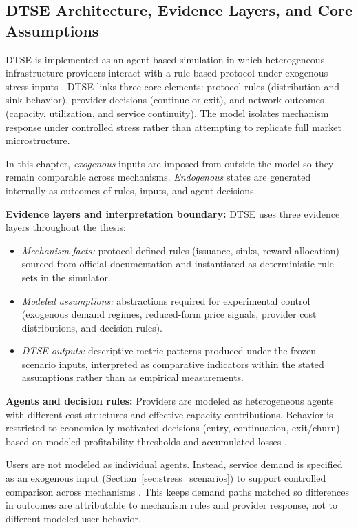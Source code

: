 \subsection{DTSE Architecture, Evidence Layers, and Core Assumptions}
\label{subsec:dtse_model_overview_assumptions}
DTSE is implemented as an agent-based simulation in which heterogeneous infrastructure providers interact with a rule-based protocol under exogenous stress inputs \cite{Collins2024, McCulloch2022}. DTSE links three core elements: protocol rules (distribution and sink behavior), provider decisions (continue or exit), and network outcomes (capacity, utilization, and service continuity). The model isolates mechanism response under controlled stress rather than attempting to replicate full market microstructure.

In this chapter, \emph{exogenous} inputs are imposed from outside the model so they remain comparable across mechanisms. \emph{Endogenous} states are generated internally as outcomes of rules, inputs, and agent decisions.

\noindent\textbf{Evidence layers and interpretation boundary:}
DTSE uses three evidence layers throughout the thesis:
\begin{itemize}
    \item \emph{Mechanism facts:} protocol-defined rules (issuance, sinks, reward allocation) sourced from official documentation and instantiated as deterministic rule sets in the simulator.
    \item \emph{Modeled assumptions:} abstractions required for experimental control (exogenous demand regimes, reduced-form price signals, provider cost distributions, and decision rules).
    \item \emph{DTSE outputs:} descriptive metric patterns produced under the frozen scenario inputs, interpreted as comparative indicators within the stated assumptions rather than as empirical measurements.
\end{itemize}

\noindent\textbf{Agents and decision rules:}
Providers are modeled as heterogeneous agents with different cost structures and effective capacity contributions. Behavior is restricted to economically motivated decisions (entry, continuation, exit/churn) based on modeled profitability thresholds and accumulated losses \cite{Collins2024, McCulloch2022}.

Users are not modeled as individual agents. Instead, service demand is specified as an exogenous input (Section~\ref{sec:stress_scenarios}) to support controlled comparison across mechanisms \cite{Morris2019, Braakman2022}. This keeps demand paths matched so differences in outcomes are attributable to mechanism rules and provider response, not to different modeled user behavior.

